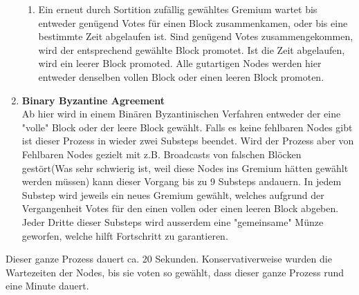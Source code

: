 \documentclass[11pt,a4paper]{article}
\begin{document}
\begin{enumerate}[label=\arabic*)]
\begin{enumerate}[label=\Roman*)]
		\item Ein erneut durch Sortition zuf\"allig gew\"ahltes Gremium wartet bis entweder gen\"ugend Votes f\"ur einen Block zusammenkamen, oder bis eine bestimmte Zeit abgelaufen ist. 
		Sind gen\"ugend Votes zusammengekommen, wird der entsprechend gew\"ahlte Block promotet.
		Ist die Zeit abgelaufen, wird ein leerer Block promoted. 
		Alle gutartigen Nodes werden hier entweder denselben vollen Block oder einen leeren Block promoten. 
	\end{enumerate}
	\item \textbf{Binary Byzantine Agreement}\\
	Ab hier wird in einem Bin\"aren Byzantinischen Verfahren entweder der eine "volle" Block oder der leere Block gew\"ahlt. 
	Falls es keine fehlbaren Nodes gibt ist dieser Prozess in wieder zwei Substeps beendet.
	Wird der Prozess aber von Fehlbaren Nodes gezielt mit z.B. Broadcasts von falschen Bl\"ocken gest\"ort(Was sehr schwierig ist, weil diese Nodes ins Gremium h\"atten gew\"ahlt werden m\"ussen) kann dieser Vorgang bis zu 9 Substeps andauern.
	In jedem Substep wird jeweils ein neues Gremium gew\"ahlt, welches aufgrund der Vergangenheit Votes f\"ur den einen vollen oder einen leeren Block abgeben. 
	Jeder Dritte dieser Substeps wird ausserdem eine "gemeinsame" M\"unze geworfen, welche hilft Fortschritt zu garantieren. 
\end{enumerate}
Dieser ganze Prozess dauert ca. 20 Sekunden. Konservativerweise wurden die Wartezeiten der Nodes, bis sie voten so gew\"ahlt, dass dieser ganze Prozess rund eine Minute dauert.
\end{document}
